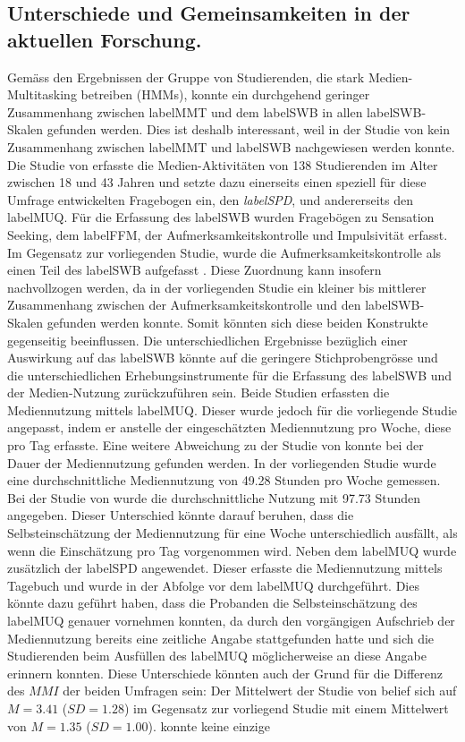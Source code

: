 \subsection{Unterschiede und Gemeinsamkeiten in der aktuellen Forschung.} Ge\-mäss den Ergebnissen der Gruppe von Studierenden, die stark Medien-Multitasking betreiben (HMMs), konnte ein durchgehend geringer Zusammenhang zwischen \gls{labelMMT} und dem \gls{labelSWB} in allen \gls{labelSWB}-Skalen gefunden werden. Dies ist deshalb interessant, weil in der Studie von  kein Zusammenhang zwischen \gls{labelMMT} und \gls{labelSWB} nachgewiesen werden konnte. Die Studie von \citeauthor{Shih2013} erfasste die Medien-Aktivitäten von 138 Studierenden im Alter zwischen 18 und 43 Jahren und setzte dazu einerseits einen speziell für diese Umfrage entwickelten Fragebogen ein, den \textit{\gls{labelSPD}}, und andererseits den \gls{labelMUQ}. Für die Erfassung des \gls{labelSWB} wurden Fragebögen zu Sensation Seeking, dem \gls{labelFFM}, der Aufmerksamkeitskontrolle und Impulsivität erfasst. Im Gegensatz zur vorliegenden Studie, wurde die Aufmerksamkeitskontrolle als einen Teil des \gls{labelSWB} aufgefasst \cite{Fergus2012}. Diese Zuordnung kann insofern nachvollzogen werden, da in der vorliegenden Studie ein kleiner bis mittlerer Zusammenhang zwischen der Aufmerksamkeitskontrolle und den \gls{labelSWB}-Skalen gefunden werden konnte. Somit könnten sich diese beiden Konstrukte gegenseitig beeinflussen. Die unterschiedlichen Ergebnisse bezüglich einer Auswirkung auf das \gls{labelSWB} könnte auf die geringere Stichprobengrösse und die unterschiedlichen Erhebungsinstrumente für die Erfassung des \gls{labelSWB} und der Medien-Nutzung zurückzuführen sein. Beide Studien erfassten die Mediennutzung mittels \gls{labelMUQ}. Dieser wurde jedoch für die vorliegende Studie angepasst, indem er anstelle der eingeschätzten Mediennutzung pro Woche, diese pro Tag erfasste. Eine weitere Abweichung zu der Studie von  konnte bei der Dauer der Mediennutzung gefunden werden. In der vorliegenden Studie wurde eine durchschnittliche Mediennutzung von 49.28 Stunden pro Woche gemessen. Bei der Studie von \citeauthor{Shih2013} wurde die durchschnittliche Nutzung mit 97.73 Stunden angegeben. Dieser Unterschied könnte darauf beruhen, dass die Selbsteinschätzung der Mediennutzung für eine Woche unterschiedlich ausfällt, als wenn die Einschätzung pro Tag vorgenommen wird. Neben dem \gls{labelMUQ} wurde zusätzlich der \gls{labelSPD} angewendet. Dieser erfasste die Mediennutzung mittels Tagebuch und wurde in der Abfolge vor dem \gls{labelMUQ} durchgeführt. Dies könnte dazu geführt haben, dass die Probanden die Selbsteinschätzung des \gls{labelMUQ} genauer vornehmen konnten, da durch den vorgängigen Aufschrieb der Mediennutzung bereits eine zeitliche Angabe stattgefunden hatte und sich die Studierenden beim Ausfüllen des \gls{labelMUQ} möglicherweise an diese Angabe erinnern konnten. Diese Unterschiede könnten auch der Grund für die Differenz des $MMI$ der beiden Umfragen sein: Der Mittelwert der Studie von  belief sich auf $M=3.41$ ($SD=1.28$) im Gegensatz zur vorliegend Studie mit einem Mittelwert von $M=1.35$ ($SD=1.00$). \citeauthor{Shih2013} konnte keine einzige 